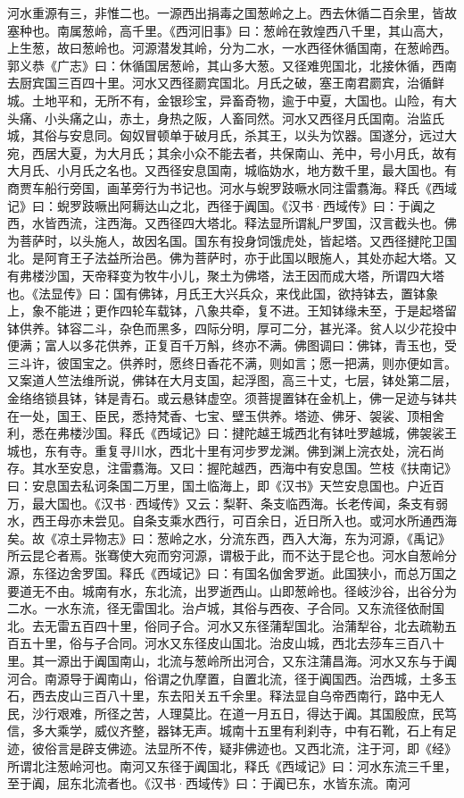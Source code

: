 \documentclass[12pt,UTF8]{ctexbook}
\begin{document}
河水重源有三，非惟二也。一源西出捐毒之国葱岭之上。西去休循二百余里，皆故塞种也。南属葱岭，高千里。《西河旧事》曰：葱岭在敦煌西八千里，其山高大，上生葱，故曰葱岭也。河源潜发其岭，分为二水，一水西径休循国南，在葱岭西。郭义恭《广志》曰：休循国居葱岭，其山多大葱。又径难兜国北，北接休循，西南去厨宾国三百四十里。河水又西径罽宾国北。月氏之破，塞王南君罽宾，治循鲜城。土地平和，无所不有，金银珍宝，异畜奇物，逾于中夏，大国也。山险，有大头痛、小头痛之山，赤土，身热之阪，人畜同然。河水又西径月氏国南。治监氏城，其俗与安息同。匈奴冒顿单于破月氏，杀其王，以头为饮器。国遂分，远过大宛，西居大夏，为大月氏；其余小众不能去者，共保南山、羌中，号小月氏，故有大月氏、小月氏之名也。又西径安息国南，城临妫水，地方数千里，最大国也。有商贾车船行旁国，画革旁行为书记也。河水与蜺罗跂噘水同注雷翥海。释氏《西域记》曰：蜺罗跂噘出阿耨达山之北，西径于阗国。《汉书·西域传》曰：于阗之西，水皆西流，注西海。又西径四大塔北。释法显所谓糺尸罗国，汉言截头也。佛为菩萨时，以头施人，故因名国。国东有投身饲饿虎处，皆起塔。又西径揵陀卫国北。是阿育王子法益所治邑。佛为菩萨时，亦于此国以眼施人，其处亦起大塔。又有弗楼沙国，天帝释变为牧牛小儿，聚土为佛塔，法王因而成大塔，所谓四大塔也。《法显传》曰：国有佛钵，月氏王大兴兵众，来伐此国，欲持钵去，置钵象上，象不能进；更作四轮车载钵，八象共牵，复不进。王知钵缘未至，于是起塔留钵供养。钵容二斗，杂色而黑多，四际分明，厚可二分，甚光泽。贫人以少花投中便满；富人以多花供养，正复百千万斛，终亦不满。佛图调曰：佛钵，青玉也，受三斗许，彼国宝之。供养时，愿终日香花不满，则如言；愿一把满，则亦便如言。又案道人竺法维所说，佛钵在大月支国，起浮图，高三十丈，七层，钵处第二层，金络络锁县钵，钵是青石。或云悬钵虚空。须菩提置钵在金机上，佛一足迹与钵共在一处，国王、臣民，悉持梵香、七宝、壁玉供养。塔迹、佛牙、袈裟、顶相舍利，悉在弗楼沙国。释氏《西域记》曰：揵陀越王城西北有钵吐罗越城，佛袈裟王城也，东有寺。重复寻川水，西北十里有河步罗龙渊。佛到渊上浣衣处，浣石尚存。其水至安息，注雷翥海。又曰：握陀越西，西海中有安息国。竺枝《扶南记》曰：安息国去私诃条国二万里，国土临海上，即《汉书》天竺安息国也。户近百万，最大国也。《汉书·西域传》又云：梨靬、条支临西海。长老传闻，条支有弱水，西王母亦未尝见。自条支乘水西行，可百余日，近日所入也。或河水所通西海矣。故《凉土异物志》曰：葱岭之水，分流东西，西入大海，东为河源，《禹记》所云昆仑者焉。张骞使大宛而穷河源，谓极于此，而不达于昆仑也。河水自葱岭分源，东径边舍罗国。释氏《西域记》曰：有国名伽舍罗逝。此国狭小，而总万国之要道无不由。城南有水，东北流，出罗逝西山。山即葱岭也。径岐沙谷，出谷分为二水。一水东流，径无雷国北。治卢城，其俗与西夜、子合同。又东流径依耐国北。去无雷五百四十里，俗同子合。河水又东径蒲犁国北。治蒲犁谷，北去疏勒五百五十里，俗与子合同。河水又东径皮山国北。治皮山城，西北去莎车三百八十里。其一源出于阗国南山，北流与葱岭所出河合，又东注蒲昌海。河水又东与于阗河合。南源导于阗南山，俗谓之仇摩置，自置北流，径于阗国西。治西城，土多玉石，西去皮山三百八十里，东去阳关五千余里。释法显自乌帝西南行，路中无人民，沙行艰难，所径之苦，人理莫比。在道一月五日，得达于阗。其国殷庶，民笃信，多大乘学，威仪齐整，器钵无声。城南十五里有利刹寺，中有石靴，石上有足迹，彼俗言是辟支佛迹。法显所不传，疑非佛迹也。又西北流，注于河，即《经》所谓北注葱岭河也。南河又东径于阗国北，释氏《西域记》曰：河水东流三千里，至于阗，屈东北流者也。《汉书·西域传》曰：于阗已东，水皆东流。南河
\end{document}
